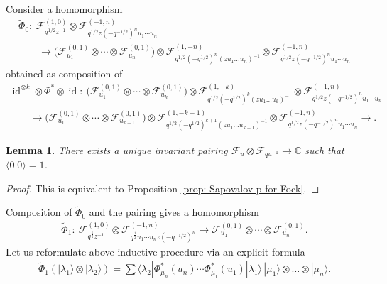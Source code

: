 \documentclass[pdftex]{sigma}
\numberwithin{equation}{section}
\newtheorem{Lemma}[Theorem]{Lemma}
\theoremstyle{definition}
\newcommand{\half}{\frac{1}{2}}
\DeclareMathOperator{\id}{id}
\begin{document}
Consider a homomorphism
\begin{gather*}
\tilde{\Phi}_0 \colon \ \mathcal{F}^{(1,0)}_{q^{1/2} z^{-1}} \otimes \mathcal{F}^{(-1,n)}_{q^{1/2} z (-q^{-1/2})^n u_1 \cdots u_n} \\ \qquad{} \rightarrow\big( \mathcal{F}^{(0,1)}_{u_1} \otimes \cdots \otimes \mathcal{F}^{(0,1)}_{u_n} \big) \otimes \mathcal{F}^{(1,-n)}_{q^{1/2} (-q^{1/2})^{n} (z u_1 \dots u_{n})^{-1} } \otimes \mathcal{F}^{(-1,n)}_{q^{1/2} z (-q^{-1/2})^n u_1 \cdots u_n}
\end{gather*}
obtained as composition of
\begin{gather*}
\id^{\otimes k} \otimes \Phi^* \otimes \id \colon\ \big( \mathcal{F}^{(0,1)}_{u_{1}} \otimes \cdots \otimes \mathcal{F}^{(0,1)}_{u_{k}} \big) \otimes \mathcal{F}^{(1,-k)}_{q^{1/2} (-q^{1/2})^k (z u_1 \dots u_k)^{-1} } \otimes \mathcal{F}^{(-1,n)}_{q^{1/2} z (-q^{-1/2})^n u_1 \cdots u_n} \\
\qquad{} \rightarrow\big( \mathcal{F}^{(0,1)}_{u_{1}} \otimes \cdots \otimes \mathcal{F}^{(0,1)}_{u_{k+1}} \big) \otimes \mathcal{F}^{(1,-k-1)}_{q^{1/2} (-q^{1/2})^{k+1} (z u_1 \dots u_{k+1})^{-1} } \otimes \mathcal{F}^{(-1,n)}_{q^{1/2} z (-q^{-1/2})^n u_1 \cdots u_n} \rightarrow.
\end{gather*}

\begin{Lemma}There exists a unique invariant pairing $\mathcal{F}_{u} \otimes \mathcal{F}_{q u^{-1}} \rightarrow \mathbb{C}$ such that $\langle 0 | 0 \rangle =1$.
\end{Lemma}
\begin{proof}
This is equivalent to Proposition \ref{prop: Sapovalov p for Fock}.
\end{proof}

Composition of $\tilde{\Phi}_0$ and the pairing gives a homomorphism
\begin{gather*}
\tilde{\Phi}_1 \colon \ \mathcal{F}^{(1,0)}_{q^{\half}z^{-1}} \otimes \mathcal{F}^{(-1,n)}_{q^{\half} u_1 \cdots u_n z (-q^{-1/2})^n} \rightarrow \mathcal{F}^{(0,1)}_{u_1} \otimes \cdots \otimes \mathcal{F}^{(0,1)}_{u_n} . %
\end{gather*}
Let us reformulate above inductive procedure via an explicit formula
\begin{gather*}
\tilde{\Phi}_1 ( | \lambda_1 \rangle \otimes | \lambda_2 \rangle ) = \sum \langle \lambda_2 | \Phi_{\mu_n}^*(u_n) \cdots \Phi_{\mu_1}^*(u_1) | \lambda_1 \rangle \, | \mu_1 \rangle \otimes \dots \otimes | \mu_n \rangle .
\end{gather*}
\end{document}
